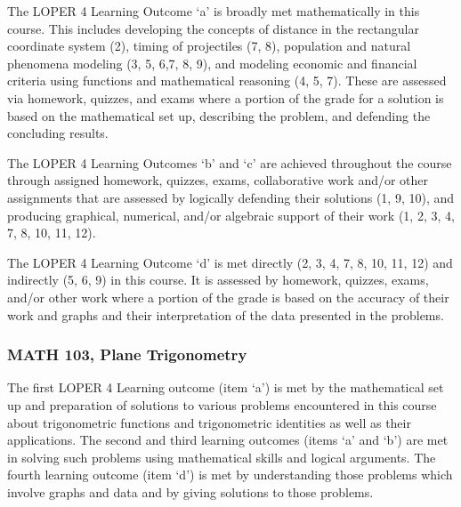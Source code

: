 \documentclass[11pt]{article}
\begin{document}
\begin{comment} Jia's proposal for replacement for MATH 102


    Understand the definition, notation, arithmetic, graph, and 
    transformations of a function

    Solve equations and inequalities involving linear, quadratic, 
    and/or absolute value functions

    Understand the graph, factorization, and real/complex zeros 
    of a polynomial

    Be familiar with the graphs of rational functions and solve 
    rational inequalities

    Understand the concepts of composite functions, one-to-one 
    functions and inverse functions 
    Use exponential and logarithmic functions to solve 
    equations, inequalities, and applied problems

    Solve a system of linear equations using Gaussian elimination 
    and augmented matrices
    
    Develop an understanding of sequences and the summation 
    notation
\end{comment}
The LOPER 4 Learning Outcome `a' is broadly met mathematically 
in this course.  This includes developing the concepts of distance 
in the rectangular coordinate system (2), timing of projectiles (7, 8),  
population and natural phenomena modeling (3, 5, 6,7, 8, 9), and modeling 
economic and financial criteria using functions and mathematical reasoning (4, 5, 7).  
These are assessed via homework, quizzes, and exams where a portion of the grade 
for a solution is based on the mathematical set up, describing the problem, and 
defending the concluding results. 

The LOPER 4 Learning 
Outcomes `b' and `c' are achieved throughout the course through assigned homework, 
quizzes, exams, collaborative work and/or other assignments that are assessed by 
logically defending their solutions (1, 9, 10), and producing graphical, numerical, 
and/or algebraic support of their work (1, 2, 3, 4, 7, 8, 10, 11, 12).  

 The LOPER 4 Learning 
Outcome `d' is met directly (2, 3, 4, 7, 8, 10, 11, 12) and indirectly (5, 6, 9) 
in this course.  It is assessed by homework, quizzes, exams, and/or other work where 
a portion of the grade is based on the accuracy of their work and graphs and their 
interpretation of the data presented in the problems. 

\subsubsection{MATH 103, Plane Trigonometry} 
The first LOPER 4 Learning outcome (item `a') is met by 
the mathematical set up and preparation of solutions to various problems 
encountered in this course about trigonometric functions and 
trigonometric identities as well as their applications. The second 
and third learning outcomes (items `a' and `b') are met in solving 
such problems using 
mathematical skills and logical arguments. The fourth learning 
outcome (item `d') is met by understanding those problems which involve graphs 
and data and by giving solutions to those problems. 
\end{document}
